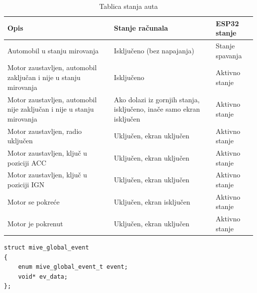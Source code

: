 \begin{table}[H]
  \begin{tabularx}{\textwidth} { 
  | >{\raggedright\arraybackslash}X 
  | >{\raggedright\arraybackslash}X 
  | >{\raggedright\arraybackslash}X | }
    \hline
    \textbf{Opis} & \textbf{Stanje računala} & \textbf{ESP32 stanje} \\
    \hline
    \hline
    Automobil u stanju mirovanja & Isključeno (bez napajanja) & Stanje spavanja \\
    \hline
    Motor zaustavljen, automobil zaključan i nije u stanju mirovanja & Isključeno & Aktivno stanje \\
    \hline
    Motor zaustavljen, automobil nije zaključan i nije u stanju mirovanja & Ako dolazi iz gornjih stanja, isključeno, inače samo ekran isključen & Aktivno stanje \\
    \hline
    Motor zaustavljen, radio uključen & Uključen, ekran uključen & Aktivno stanje \\
    \hline
    Motor zaustavljen, ključ u poziciji ACC & Uključen, ekran uključen & Aktivno stanje \\
    \hline
    Motor zaustavljen, ključ u poziciji IGN & Uključen, ekran uključen & Aktivno stanje \\
    \hline
    Motor se pokreće & Uključen, ekran isključen & Aktivno stanje \\
    \hline
    Motor je pokrenut & Uključen, ekran uključen & Aktivno stanje \\
    \hline
  \end{tabularx}
  \caption{Tablica stanja auta}
  \label{tbl:car-states}
\end{table}

\begin{listing}[H]
  \begin{verbatim}
struct mive_global_event
{
    enum mive_global_event_t event;
    void* ev_data;
};
  \end{verbatim}
  \caption{Definicija strukture događaja (eng. \textit{event})}
  \label{lst:mive_global_event}
\end{listing}

